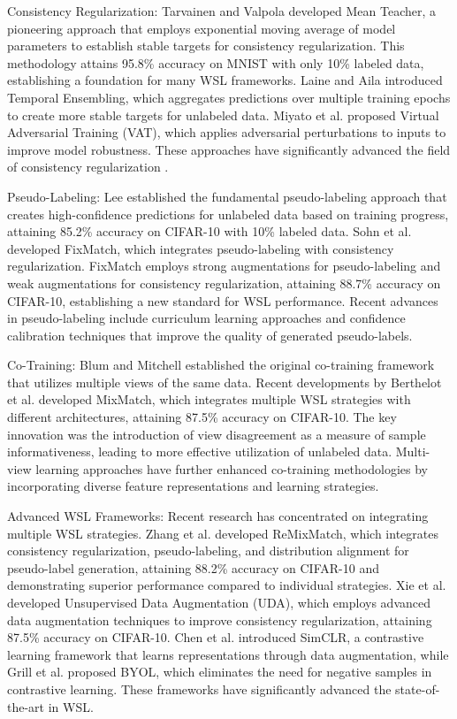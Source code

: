 \documentclass{ieeeaccess}
\begin{document}
Consistency Regularization: Tarvainen and Valpola \cite{b1} developed Mean Teacher, a pioneering approach that employs exponential moving average of model parameters to establish stable targets for consistency regularization. This methodology attains 95.8\% accuracy on MNIST with only 10\% labeled data, establishing a foundation for many WSL frameworks. Laine and Aila \cite{b16} introduced Temporal Ensembling, which aggregates predictions over multiple training epochs to create more stable targets for unlabeled data. Miyato et al. \cite{b17} proposed Virtual Adversarial Training (VAT), which applies adversarial perturbations to inputs to improve model robustness. These approaches have significantly advanced the field of consistency regularization \cite{b16,b17}.

Pseudo-Labeling: Lee \cite{b2} established the fundamental pseudo-labeling approach that creates high-confidence predictions for unlabeled data based on training progress, attaining 85.2\% accuracy on CIFAR-10 with 10\% labeled data. Sohn et al. \cite{b6} developed FixMatch, which integrates pseudo-labeling with consistency regularization. FixMatch employs strong augmentations for pseudo-labeling and weak augmentations for consistency regularization, attaining 88.7\% accuracy on CIFAR-10, establishing a new standard for WSL performance. Recent advances in pseudo-labeling include curriculum learning approaches \cite{b21} and confidence calibration techniques \cite{b22} that improve the quality of generated pseudo-labels.

Co-Training: Blum and Mitchell \cite{b3} established the original co-training framework that utilizes multiple views of the same data. Recent developments by Berthelot et al. \cite{b7} developed MixMatch, which integrates multiple WSL strategies with different architectures, attaining 87.5\% accuracy on CIFAR-10. The key innovation was the introduction of view disagreement as a measure of sample informativeness, leading to more effective utilization of unlabeled data. Multi-view learning approaches \cite{b5} have further enhanced co-training methodologies by incorporating diverse feature representations and learning strategies.

Advanced WSL Frameworks: Recent research has concentrated on integrating multiple WSL strategies. Zhang et al. \cite{b8} developed ReMixMatch, which integrates consistency regularization, pseudo-labeling, and distribution alignment for pseudo-label generation, attaining 88.2\% accuracy on CIFAR-10 and demonstrating superior performance compared to individual strategies. Xie et al. \cite{b11} developed Unsupervised Data Augmentation (UDA), which employs advanced data augmentation techniques to improve consistency regularization, attaining 87.5\% accuracy on CIFAR-10. Chen et al. \cite{b23} introduced SimCLR, a contrastive learning framework that learns representations through data augmentation, while Grill et al. \cite{b24} proposed BYOL, which eliminates the need for negative samples in contrastive learning. These frameworks have significantly advanced the state-of-the-art in WSL.
\end{document}
